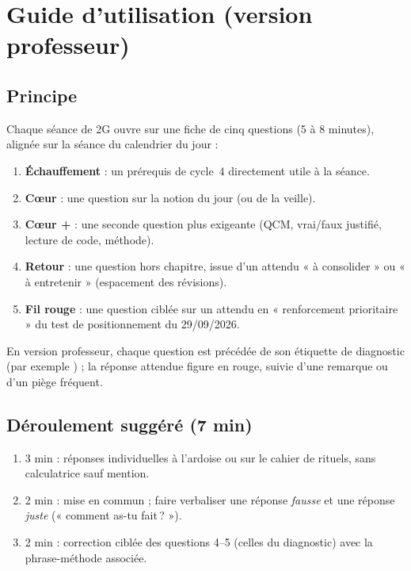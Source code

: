 \section{Guide d'utilisation (version professeur)}
\subsection*{Principe}
Chaque séance de 2G ouvre sur une fiche de cinq questions (5 à 8 minutes), alignée sur la séance du calendrier du jour :
\begin{enumerate}[label=\textbf{\arabic*.},leftmargin=1.6em]
  \item \textbf{Échauffement} : un prérequis de cycle~4 directement utile à la séance.
  \item \textbf{Cœur} : une question sur la notion du jour (ou de la veille).
  \item \textbf{Cœur +} : une seconde question plus exigeante (QCM, vrai/faux justifié, lecture de code, méthode).
  \item \textbf{Retour} : une question hors chapitre, issue d'un attendu « à consolider » ou « à entretenir » (espacement des révisions).
  \item \textbf{Fil rouge} : une question ciblée sur un attendu en « renforcement prioritaire » du test de positionnement du 29/09/2026.
\end{enumerate}
En version professeur, chaque question est précédée de son étiquette de diagnostic (par exemple ) ; la réponse attendue figure en rouge, suivie d'une remarque ou d'un piège fréquent.

\subsection*{Déroulement suggéré (7 min)}
\begin{enumerate}[label=\textbf{\arabic*.},leftmargin=1.6em]
  \item 3 min : réponses individuelles à l'ardoise ou sur le cahier de rituels, sans calculatrice sauf mention.
  \item 2 min : mise en commun ; faire verbaliser une réponse \emph{fausse} et une réponse \emph{juste} (« comment as-tu fait\,? »).
  \item 2 min : correction ciblée des questions 4--5 (celles du diagnostic) avec la phrase-méthode associée.
\end{enumerate}

